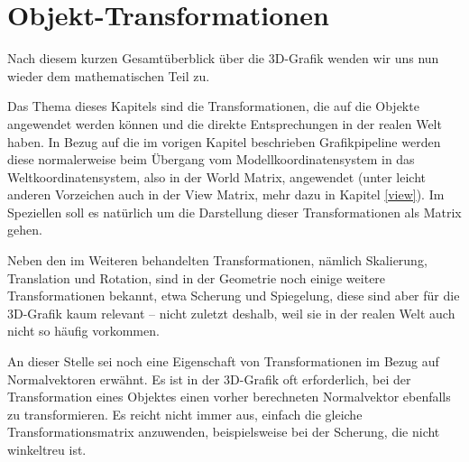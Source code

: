 \chapter{Objekt-Transformationen}
\label{3d-transformations}

Nach diesem kurzen Gesamtüberblick über die 3D-Grafik wenden wir uns nun wieder dem mathematischen Teil zu.

Das Thema dieses Kapitels sind die Transformationen, die auf die Objekte angewendet werden können und die direkte Entsprechungen in der realen Welt haben. In Bezug auf die im vorigen Kapitel beschrieben Grafikpipeline werden diese normalerweise beim Übergang vom Modellkoordinatensystem in das Weltkoordinatensystem, also in der World Matrix, angewendet (unter leicht anderen Vorzeichen auch in der View Matrix, mehr dazu in Kapitel \ref{view}). Im Speziellen soll es natürlich um die Darstellung dieser Transformationen als Matrix gehen.

Neben den im Weiteren behandelten Transformationen, nämlich Skalierung, Translation und Rotation, sind in der Geometrie noch einige weitere Transformationen bekannt, etwa Scherung und Spiegelung, diese sind aber für die 3D-Grafik kaum relevant -- nicht zuletzt deshalb, weil sie in der realen Welt auch nicht so häufig vorkommen.

An dieser Stelle sei noch eine Eigenschaft von Transformationen im Bezug auf Normalvektoren erwähnt. Es ist in der 3D-Grafik oft erforderlich, bei der Transformation eines Objektes einen vorher berechneten Normalvektor ebenfalls zu transformieren. Es reicht nicht immer aus, einfach die gleiche Transformationsmatrix anzuwenden, beispielsweise bei der Scherung, die nicht winkeltreu ist. 


